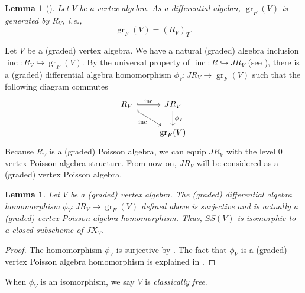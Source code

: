 \documentclass[a4paper, 12pt, reqno]{amsart}
\newtheorem{lemma}[theorem]{Lemma}
\theoremstyle{remark}
\DeclareMathOperator{\gr}{gr}
\DeclareMathOperator{\inc}{inc}
\begin{document}
\begin{lemma}[{\cite[Corollary 4.3]{li_abelianizing_2005}}]
  \label{lmm:26}
  Let $V$ be a vertex algebra.
  As a differential algebra, $\gr_F(V)$ is generated by $R_V$, i.e.,
  \begin{equation*}
    \gr_F(V) = (R_V)_T.
  \end{equation*}
\end{lemma}

Let $V$ be a (graded) vertex algebra.
We have a natural (graded) algebra inclusion $\inc: R_V \hookrightarrow \gr_F(V)$.
By the universal property of $\inc: R \hookrightarrow JR_V$ (see ), there is a (graded) differential algebra homomorphism $\phi_V: JR_V \to \gr_F(V)$ such that the following diagram commutes
\begin{equation*}
  \begin{tikzcd}
    R_V \arrow[rd, "\inc"', hook] \arrow[r, "\inc", hook] & JR_V \arrow[d, "\phi_V"] \\
    & \gr_F(V)
  \end{tikzcd}
\end{equation*}
Because $R_V$ is a (graded) Poisson algebra, we can equip $JR_V$ with the level 0 vertex Poisson algebra structure.
From now on, $JR_V$ will be considered as a (graded) vertex Poisson algebra.

\begin{lemma}
  \label{lmm:27}
  Let $V$ be a (graded) vertex algebra.
  The (graded) differential algebra homomorphism $\phi_V: JR_V \to \gr_F(V)$ defined above is surjective and is actually a (graded) vertex Poisson algebra homomorphism.
  Thus, $SS(V)$ is isomorphic to a closed subscheme of $JX_V$.
\end{lemma}

\begin{proof}
  The homomorphism $\phi_V$ is surjective by .
  The fact that $\phi_V$ is a (graded) vertex Poisson algebra homomorphism is explained in \cite[Proposition 2.5.1]{arakawa_remark_2012}.
\end{proof}

When $\phi_V$ is an isomorphism, we say $V$ is \emph{classically free}.
\end{document}
